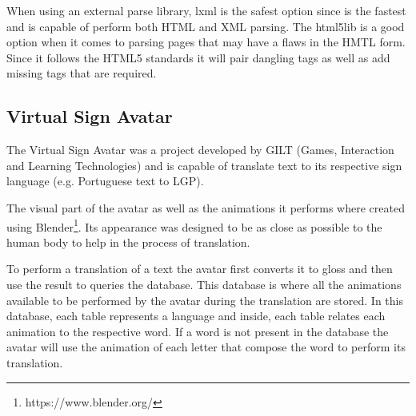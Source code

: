 When using an external parse library, lxml is the safest option since is the fastest and is capable of perform both HTML and XML parsing.
The html5lib is a good option when it comes to parsing pages that may have a flaws in the HMTL form.
Since it follows the HTML5 standards it will pair dangling tags as well as add missing tags that are required.

\subsection{Virtual Sign Avatar}

The Virtual Sign Avatar\cite{escudeiro2015virtual} was a project developed by GILT (Games, Interaction and Learning Technologies) and is capable of translate text to its respective sign language (e.g. Portuguese text to \gls{LGP}).

The visual part of the avatar as well as the animations it performs where created using Blender\footnote{https://www.blender.org/}.
Its appearance was designed to be as close as possible to the human body to help in the process of translation.

To perform a translation of a text the avatar first converts it to gloss and then use the result to queries the database.
This database is where all the animations available to be performed by the avatar during the translation are stored.
In this database, each table represents a language and inside, each table relates each animation to the respective word.
If a word is not present in the database the avatar will use the animation of each letter that compose the word to perform its translation.
